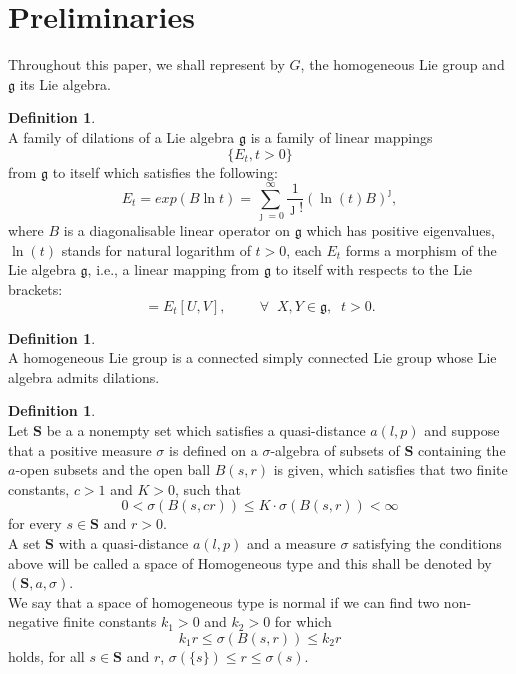 \documentclass[10pt]{article}
\theoremstyle{definition}
\newtheorem{defx}[thm]{Definition}
\numberwithin{equation}{section}
\begin{document}
	\section{Preliminaries}
	Throughout this paper,  we shall represent by $G$, the homogeneous Lie group and $\mathfrak{g}$ its Lie algebra.
	\begin{defx}
		\normalfont
		\ \\
		A family of dilations of a Lie algebra $\mathfrak{g}$ is a family of linear mappings
		\begin{equation*}
			\{E_{t},t>0\}
		\end{equation*}
		from $\mathfrak{g}$ to itself which satisfies the following:\\
		\begin{equation*}
			E_{t}=exp(B\ln t)=\sum_{\jmath=0}^{\infty}\frac{1}{\jmath!}(\ln (t)B)^{\jmath},
		\end{equation*}
where $B$ is a diagonalisable linear operator on $\mathfrak{g}$ which has positive eigenvalues, $\ln (t)$ stands for natural logarithm of $t>0$, each $E_{t}$ forms a morphism of the Lie algebra $\mathfrak{g}$, i.e.,  a linear mapping from $\mathfrak{g}$ to itself with respects to the Lie brackets:
		\begin{equation*}
			[E_{t}U,E_{t}V]=E_{t}[U,V],\hspace{1cm}\forall \;\; X,Y\in \mathfrak{g},\;\; t>0.
		\end{equation*}
	\end{defx}
	\begin{defx}
		\normalfont
		\ \\
		A homogeneous Lie group is a connected simply connected Lie group whose Lie algebra admits dilations.
	\end{defx}
	\begin{defx}
		\normalfont
		\ \\
Let $\textbf{S}$ be a a nonempty set which satisfies a quasi-distance $a(l,p)$ and suppose that a positive measure $\sigma$ is defined on a $\sigma$-algebra of subsets of $\textbf{S}$ containing the $a$-open subsets and the open ball $B(s,r)$ is given, which satisfies that two finite constants, $c>1$ and $K>0$, such that
$$0<\sigma(B(s,cr))\leq K \cdot \sigma(B(s,r))<\infty$$
for every $s\in \textbf{S}$ and $r>0$.\\
A set $\textbf{S}$ with a quasi-distance $a(l,p)$ and a measure $\sigma$ satisfying the conditions above will be called a space of Homogeneous type and this shall be denoted by $(\textbf{S},a,\sigma)$.\\
We say that a space of homogeneous type is normal if we can find two non-negative finite constants $k_1>0$ and $k_2>0$ for which $$k_1r\leq \sigma (B(s,r))\leq k_2r$$ holds, for all $s\in \textbf{S}$ and $r$, $\sigma(\{s\})\leq r\leq \sigma (s)$.
	\end{defx}
\end{document}
